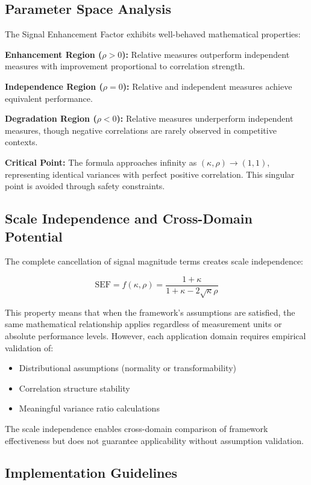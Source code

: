 \subsection{Parameter Space Analysis}

The Signal Enhancement Factor exhibits well-behaved mathematical properties:

\textbf{Enhancement Region ($\rho > 0$):} Relative measures outperform independent measures with improvement proportional to correlation strength.

\textbf{Independence Region ($\rho = 0$):} Relative and independent measures achieve equivalent performance.

\textbf{Degradation Region ($\rho < 0$):} Relative measures underperform independent measures, though negative correlations are rarely observed in competitive contexts.

\textbf{Critical Point:} The formula approaches infinity as $(\kappa, \rho) \rightarrow (1, 1)$, representing identical variances with perfect positive correlation. This singular point is avoided through safety constraints.

\subsection{Scale Independence and Cross-Domain Potential}

The complete cancellation of signal magnitude terms creates scale independence:

$$\text{SEF} = f(\kappa, \rho) = \frac{1 + \kappa}{1 + \kappa - 2\sqrt{\kappa}\rho}$$

This property means that when the framework's assumptions are satisfied, the same mathematical relationship applies regardless of measurement units or absolute performance levels. However, each application domain requires empirical validation of:
\begin{itemize}
    \item Distributional assumptions (normality or transformability)
    \item Correlation structure stability
    \item Meaningful variance ratio calculations
\end{itemize}

The scale independence enables cross-domain comparison of framework effectiveness but does not guarantee applicability without assumption validation.

\subsection{Implementation Guidelines}

